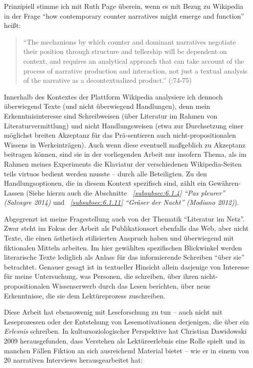\documentclass[fontsize=12pt]{scrartcl}
\begin{document}
Prinzipiell stimme ich mit Ruth Page \"uberein, wenn es mit Bezug zu Wi\-ki\-pe\-dia in der Frage "`how contemporary counter narratives might emerge and function"' hei{\ss}t:

\singlespacing
\begin{quote}
"`The mechanisms by which counter and dominant narratives negotiate their position through structure and tellership will be dependent on context, and requires an ana\-lytical approach that can take account of the process of narrative production and interaction, not just a textual ana\-lysis of the narrative as a decontextualized product."' (\cite{Page2014}:74-75)
\end{quote}
\onehalfspacing

Innerhalb des Kontextes der Plattform Wi\-ki\-pe\-dia ana\-lysiere ich den\-noch \"uber\-wie\-gend Texte (und nicht \"uberwiegend Handlungen), denn mein Erkenntnisinteresse sind Schreibweisen (\"uber Li\-te\-ra\-tur im Rahmen von Li\-te\-ra\-tur\-ver\-mitt\-lung) und nicht Handlungsweisen (etwa zur Durchsetzung einer m\"oglichst breiten Akzeptanz f\"ur das Pr\"a-sentieren auch nicht-pro\-po\-si\-ti\-o\-na\-len Wissens in Werkeintr\"agen). Auch wenn diese eventuell ma{\ss}geblich zu Akzeptanz beitragen k\"onnen, sind sie in der vorliegenden Arbeit nur insofern Thema, als im Rahmen meines Experiments die Klaviatur der verschiedenen Wi\-ki\-pe\-dia-Seiten teils virtuos bedient werden musste -- durch alle Beteiligten. Zu den Handlungsoptionen, die in diesem Kontext spezifisch sind, z\"ahlt ein Gew\"ahren-Lassen (Siehe hierzu auch die Abschnitte \textit{~\ref{subsubsec:6.1.4} "`Pas pleurer"' (Salvayre 2014)} und \textit{~\ref{subsubsec:6.1.11} "`Gr\"aser der Nacht"' (Modiano 2012)}).

Abgegrenzt ist meine Fragestellung auch von der Thematik "`Li\-te\-ra\-tur im Netz"'. Zwar steht im Fokus der Arbeit als Publikationsort ebenfalls das Web, aber nicht Texte, die einen \"asthetisch stilisierten Anspruch haben und \"uberwiegend mit fiktionalen Mitteln arbeiten. Im \mbox{hier} gew\"ahlten spezifischen Blickwinkel werden li\-te\-ra\-rische Texte lediglich als Anlass f\"ur das informierende Schrei\-ben "`\"uber sie"' betrachtet. Genauer gesagt ist in textueller Hinsicht allein dasjenige von Interesse f\"ur meine Untersuchung, was Per\-so\-nen, die schrei\-ben, \"uber ihren nicht-pro\-po\-si\-ti\-o\-na\-len Wissenserwerb durch das Lesen berichten, \"uber neue Erkenntnisse, die sie dem Lek\-t\"u\-re\-pro\-zess zuschrei\-ben.

Diese Arbeit hat ebensowenig mit Lesefor\-schung zu tun -- auch nicht mit Leseprozessen oder der Entstehung von Lesemotivationen derjenigen, die \"uber ein \textit{Erlesnis} schrei\-ben. In kultursoziologischer Perspektive hat Christian Dawidowski 2009 he\-rausgefunden, dass Verstehen als Lekt\"ureerlebnis eine Rolle spielt und in manchen F\"allen Fiktion an sich ausreichend Material bietet -- wie er in einem von 20 narrativen Interviews he\-rausgearbeitet hat: 
\end{document}
